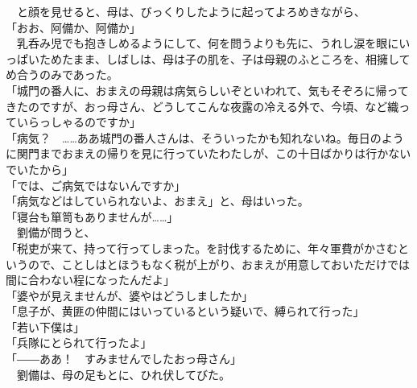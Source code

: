 \documentclass[
  paper=a5,
  fontsize=10pt,
  jafontsize=9.5pt,
  tate,                  %
  open_bracket_pos=nibu, %
]{jlreq}
\begin{document}
　と顔を見せると、母は、びっくりしたように起ってよろめきながら、\\


「おお、阿備か、阿備か」\\


　乳呑み児でも抱きしめるようにして、何を問うよりも先に、うれし涙を眼にいっぱいためたまま、しばしは、母は子の肌を、子は母親のふところを、相擁してめ合うのみであった。\\


「城門の番人に、おまえの母親は病気らしいぞといわれて、気もそぞろに帰ってきたのですが、おっ母さん、どうしてこんな夜露の冷える外で、今頃、など織っていらっしゃるのですか」\\


「病気？　……ああ城門の番人さんは、そういったかも知れないね。毎日のように関門までおまえの帰りを見に行っていたわたしが、この十日ばかりは行かないでいたから」\\


「では、ご病気ではないんですか」\\


「病気などはしていられないよ、おまえ」と、母はいった。\\


「寝台も箪笥もありませんが……」\\


　劉備が問うと、\\


「税吏が来て、持って行ってしまった。を討伐するために、年々軍費がかさむというので、ことしはとほうもなく税が上がり、おまえが用意しておいただけでは間に合わない程になったんだよ」\\


「婆やが見えませんが、婆やはどうしましたか」\\


「息子が、黄匪の仲間にはいっているという疑いで、縛られて行った」\\


「若い下僕は」\\


「兵隊にとられて行ったよ」\\


「――ああ！　すみませんでしたおっ母さん」\\


　劉備は、母の足もとに、ひれ伏してびた。\\

\\
\end{document}
